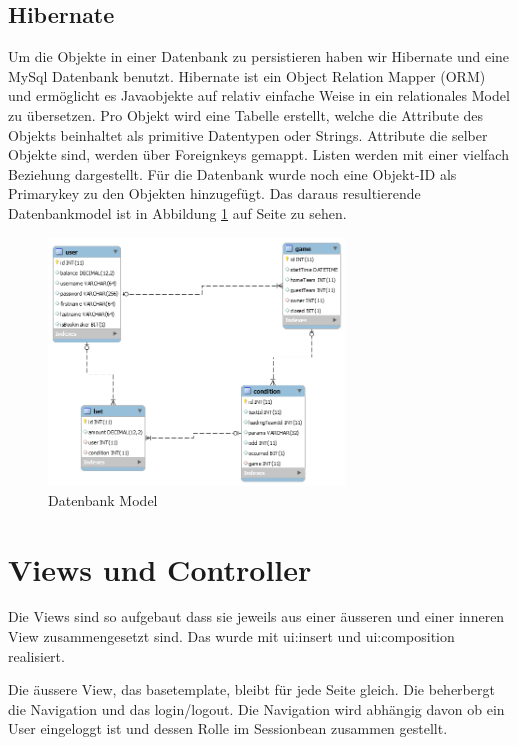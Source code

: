 \documentclass[a4paper, abstracton]{scrartcl}
\begin{document}
\subsection{Hibernate}
  Um die Objekte in einer Datenbank zu persistieren haben wir Hibernate und eine
  MySql Datenbank benutzt. Hibernate ist ein Object Relation Mapper (ORM) und
  ermöglicht es Javaobjekte auf relativ einfache Weise in ein relationales
  Model zu übersetzen. Pro Objekt wird eine Tabelle erstellt, welche
  die Attribute des Objekts beinhaltet als primitive Datentypen oder Strings.
  Attribute die selber Objekte sind, werden über Foreignkeys gemappt.
  Listen werden mit einer vielfach Beziehung dargestellt.
  Für die Datenbank wurde noch eine Objekt-ID als Primarykey zu den Objekten
  hinzugefügt.
  Das daraus resultierende Datenbankmodel ist in
  Abbildung \ref{fig:db_model} auf Seite \pageref{fig:db_model} zu sehen.


\begin{figure}[h!]
  \begin{center}
    \includegraphics[width=0.7\textwidth]{images/db_model.png}
  \end{center}
  \caption{Datenbank Model}
  \label{fig:db_model}
\end{figure}

\section{Views und Controller}

  Die Views sind so aufgebaut dass sie jeweils aus einer äusseren und einer
  inneren View zusammengesetzt sind. Das wurde mit ui:insert und ui:composition
  realisiert.
  
  Die äussere View, das basetemplate, bleibt für jede Seite gleich. Die beherbergt
  die Navigation und das login/logout. Die Navigation wird abhängig davon ob ein User eingeloggt
  ist und dessen Rolle im Sessionbean zusammen gestellt.
  
\end{document}
